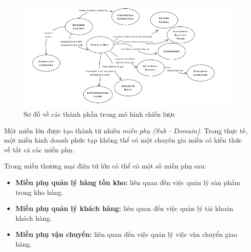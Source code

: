 \begin{figure}[H]

    \centering

    \includegraphics[scale = 0.9]{pictures/cac_mau_chien_luoc/temp.png}

    \caption{Sơ đồ về các thành phần trong mô hình chiến lược}

\end{figure}












Một miền lớn được tạo thành từ nhiều \emph{miền phụ (Sub - Domain)}. Trong thực tế, một miền kinh doanh phức tạp không thể có một chuyên gia  miền    có kiến thức về tất cả các miền phụ.

\begin{example} Trong miền thương mại điện tử lớn có thể có một số miền phụ sau:

    \begin{itemize}

        \item \textbf{Miền phụ quản lý hàng tồn kho:} liên quan đến việc quản lý sản phẩm trong kho hàng.

        \item \textbf{Miền phụ quản lý khách hàng:} liên quan đến việc quản lý tài khoản khách hàng.

        \item \textbf{Miền phụ vận chuyển:} liên quan đến việc quản lý việc vận chuyển giao hàng.

    \end{itemize}

\end{example}

